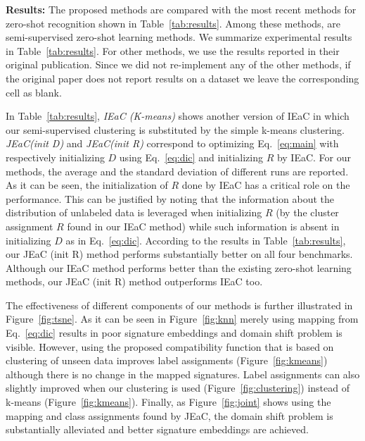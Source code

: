 \documentclass[10pt,twocolumn,letterpaper]{article}
\begin{document}
\textbf{Results:}
The proposed methods are compared with the most recent methods for zero-shot recognition shown in Table~\ref{tab:results}.
Among these methods, \cite{semi15,li15max} are semi-supervised zero-shot learning methods.
We summarize experimental results in Table~\ref{tab:results}.
For other methods, we use the results reported in their original publication.
Since we did not re-implement any of the other methods, if the original paper does not report results on a dataset we leave the corresponding cell as blank.

In Table~\ref{tab:results}, \textit{IEaC (K-means)} shows another version of IEaC in which our semi-supervised clustering is substituted by the simple k-means clustering.
 \textit{JEaC(init D)} and \textit{JEaC(init R)} correspond to optimizing Eq.~\eqref{eq:main}
with respectively initializing $D$ using Eq.~\eqref{eq:dic} and initializing $R$ by IEaC.
For our methods, the average and the standard deviation of different runs are reported. As it can be seen, the initialization of $R$ done
by IEaC has a critical role on the performance. This can be justified by noting that the information about the distribution of
unlabeled data is leveraged when initializing $R$ (by the cluster assignment $R$ found in our IEaC method)
 while such information is absent in initializing $D$ as in Eq.~\ref{eq:dic}.
%
According to the results in Table~\ref{tab:results}, our JEaC (init R) method performs substantially better on all four benchmarks. Although our IEaC method performs better than the existing zero-shot learning methods, our JEaC (init R) method outperforms IEaC too.

The effectiveness of different components of our methods is further illustrated in Figure~\ref{fig:tsne}. As it can be seen in
Figure~\ref{fig:knn} merely using mapping from Eq.~\eqref{eq:dic} results in poor signature embeddings and domain shift problem is
visible. However, using the proposed compatibility function that is based on clustering of unseen data improves label assignments (Figure~\ref{fig:kmeans}) although there is no change in the mapped signatures.
Label assignments can also slightly improved when our clustering is used  (Figure~\ref{fig:clustering}) instead of k-means (Figure~\ref{fig:kmeans}). Finally, as Figure~\ref{fig:joint} shows using
the mapping and class assignments found by JEaC, the domain shift problem is substantially alleviated and better signature embeddings are achieved.
%
%
%
%
\end{document}
